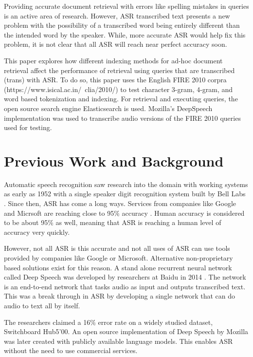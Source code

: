 \documentclass[jair, twoside,11pt,theapa]{article}
\begin{document}
Providing accurate document retrieval with errors like spelling mistakes in queries is an active area of research. However, ASR transcribed text presents a new problem with the possibility of a transcribed word being entirely different than the intended word by the speaker. While, more accurate ASR would help fix this problem, it is not clear that all ASR will reach near perfect accuracy soon. 

This paper explores how different indexing methods for ad-hoc document retrieval affect the performance of retrieval using queries that are transcribed (trans) with ASR. To do so, this paper uses the English FIRE 2010 corpra (https://www.isical.ac.in/~clia/2010/) to test character 3-gram, 4-gram, and word based tokenization and indexing. For retrieval and executing queries, the open source search engine Elasticsearch is used. Mozilla's DeepSpeech implementation \cite{mozilla} was used to transcribe audio versions of the FIRE 2010 queries used for testing. 



\section{Previous Work and Background}
\label{Background}
Automatic speech recognition saw research into the domain with working systems as early as 1952 with a single speaker digit recognition system built by Bell Labs \cite{AsrHistory}. Since then, ASR has come a long ways. Services from companies like Google and Micrsoft are reaching close to 95\% accuracy \cite{Meeker} \cite{MS-human-accuracy}. Human accuracy is considered to be about 95\% \cite{MS-human-accuracy} as well, meaning that ASR is reaching a human level of accuracy very quickly. 

However, not all ASR is this accurate and not all uses of ASR can use tools provided by companies like Google or Microsoft. Alternative non-proprietary based solutions exist for this reason. A stand alone recurrent neural network called Deep Speech was developed by researchers at Baidu in 2014 \cite{Baidu-deep}. The network is an end-to-end network that tasks audio as input and outputs transcribed text. This was a break through in ASR by developing a single network that can do audio to text all by itself. 

The researchers claimed a 16\% error rate on a widely studied dataset, Switchboard Hub5'00. An open source implementation of Deep Speech by Mozilla \cite{mozilla} was later created with publicly available language models. This enables ASR without the need to use commercial services. 
\end{document}
